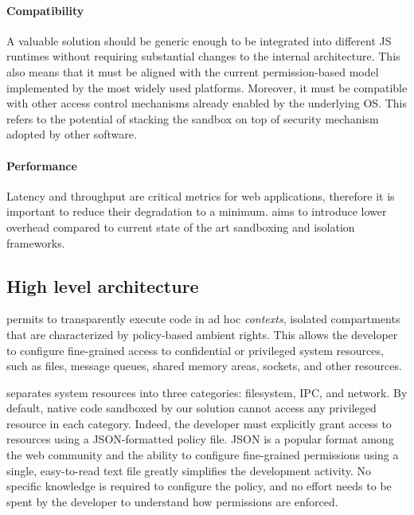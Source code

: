 \paragraph{Compatibility}
A valuable solution should be generic enough to be integrated into
different JS runtimes without requiring substantial changes to the
internal architecture. This also means that it must be aligned with
the current permission-based model implemented by the most widely used
platforms. Moreover, it must be compatible with other access control
mechanisms already enabled by the underlying OS. This refers to the
potential of stacking the sandbox on top of security mechanism adopted
by other software.

\paragraph{Performance}
Latency and throughput are critical metrics for web applications,
therefore it is important to reduce their degradation to a
minimum. \natisand aims to introduce lower overhead compared to current
state of the art sandboxing and isolation frameworks.


\subsection{High level architecture}
\label{sect:sandbox-overview}

\natisand permits to transparently execute code in ad hoc {\em contexts},
isolated compartments that are characterized by policy-based ambient
rights. This allows the developer to configure fine-grained access to
confidential or privileged system resources, such as files, message
queues, shared memory areas, sockets, and other resources.

\natisand separates system resources into three categories: filesystem,
IPC, and network. By default, native code sandboxed by our solution
cannot access any privileged resource in each category. Indeed, the
developer must explicitly grant access to resources using a
JSON-formatted policy file. JSON is a popular format among the web
community and the ability to configure fine-grained permissions using
a single, easy-to-read text file greatly simplifies the development
activity. No specific knowledge is required to configure the policy,
and no effort needs to be spent by the developer to understand how
permissions are enforced.

